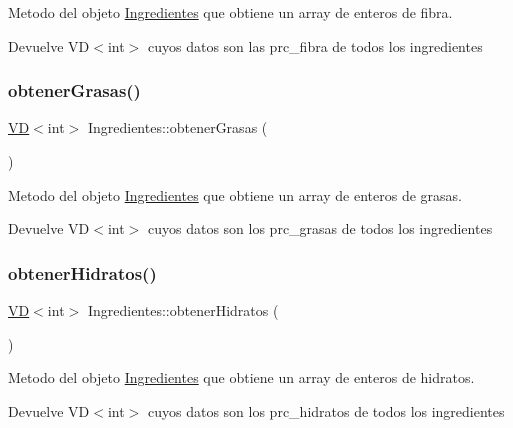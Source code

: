 Metodo del objeto \hyperlink{classIngredientes}{Ingredientes} que obtiene un array de enteros de fibra. 

\begin{DoxyReturn}{Devuelve}
V\+D$<$int$>$ cuyos datos son las prc\+\_\+fibra de todos los ingredientes 
\end{DoxyReturn}
\mbox{\label{classIngredientes_a4a2711aa37d3653634d5a54e3f59fef8}} 
\subsubsection{\texorpdfstring{obtener\+Grasas()}{obtenerGrasas()}}
{\footnotesize\ttfamily \hyperlink{classVD}{VD}$<$int$>$ Ingredientes\+::obtener\+Grasas (\begin{DoxyParamCaption}{ }\end{DoxyParamCaption})}



Metodo del objeto \hyperlink{classIngredientes}{Ingredientes} que obtiene un array de enteros de grasas. 

\begin{DoxyReturn}{Devuelve}
V\+D$<$int$>$ cuyos datos son los prc\+\_\+grasas de todos los ingredientes 
\end{DoxyReturn}
\mbox{\label{classIngredientes_a5ee2f129cb9b8e10233c8825434d02f8}} 
\subsubsection{\texorpdfstring{obtener\+Hidratos()}{obtenerHidratos()}}
{\footnotesize\ttfamily \hyperlink{classVD}{VD}$<$int$>$ Ingredientes\+::obtener\+Hidratos (\begin{DoxyParamCaption}{ }\end{DoxyParamCaption})}



Metodo del objeto \hyperlink{classIngredientes}{Ingredientes} que obtiene un array de enteros de hidratos. 

\begin{DoxyReturn}{Devuelve}
V\+D$<$int$>$ cuyos datos son los prc\+\_\+hidratos de todos los ingredientes 
\end{DoxyReturn}
\mbox{\label{classIngredientes_a0fc7e034c76a34734fa058176787b18f}} 
